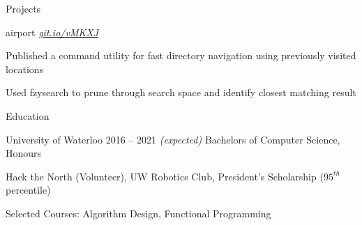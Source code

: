 \documentclass{resume} %
\begin{document}
\begin{rSection}{Projects}
  \begin{rSubsection}{airport}
	  {\em{ \href{http://github.com/ridwanmsharif/airport}
		    {git.io/vMKXJ}}}
	  {}

	\item Published a command utility for fast directory navigation using
		previously visited locations
	\item Used fzysearch to prune through search space and identify closest
		matching result
  \end{rSubsection}
\end{rSection}


\begin{rSection}{Education}
  \begin{rSubsection}{University of Waterloo}
		     {2016 -- 2021 \em (expected)}
		     {Bachelors of Computer Science, Honours}
		     {}
	\item Hack the North (Volunteer), UW Robotics Club,
		President's Scholarship ($95^{th}$ percentile)
	\item Selected Courses: Algorithm Design, Functional Programming
  \end{rSubsection}
\end{rSection} 


\end{document}
